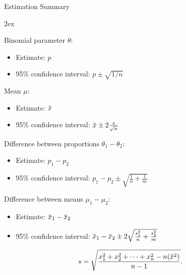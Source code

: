 \documentclass[10pt, xcolor=table]{beamer}
\newcommand{\overbar}[1]{\mkern 1.5mu\overline{\mkern-1.5mu#1\mkern-1.5mu}\mkern 1.5mu}
\begin{document}
\begin{frame}{Estimation Summary}
\begin{itemize}\itemsep2ex
\vspace*{2ex}
\item Binomial parameter $\theta$:
\begin{itemize}
\item[] Estimate: $p$
\item[] 95\% confidence interval: $p \pm \sqrt{1/n}$
\end{itemize}
\item Mean $\mu$:
\begin{itemize}
\item[] Estimate: $\overbar{x}$
\item[] 95\% confidence interval: $\overbar{x} \pm 2\frac{s}{\sqrt{n}}$
\end{itemize}
\item Difference between proportions $\theta_1 - \theta_2$:
\begin{itemize}
\item[] Estimate: $p_1 - p_2$
\item[] 95\% confidence interval: ${p_1 - p_2 \pm  \sqrt{ \frac{1}{n} +  \frac{1}{m}}}$
\end{itemize}
\item Difference between means $\mu_1 - \mu_2$:
\begin{itemize}
\item[] Estimate: $\overbar{x}_1 - \overbar{x}_2$
\item[] 95\% confidence interval: $\overbar{x}_1 - \overbar{x}_2 \pm 2 \sqrt{\frac{s_1^2}{n} + \frac{s_2^2}{m}}$
\end{itemize}
\vspace*{1ex}
{\footnotesize \item[Note:] $$s = \sqrt{\frac{x_1^2  + x_2^2 + \cdots + x_n^2 - n(\overbar{x}^2)}{{ n-1}}}.$$}
\end{itemize}
\end{frame}
\end{document}
